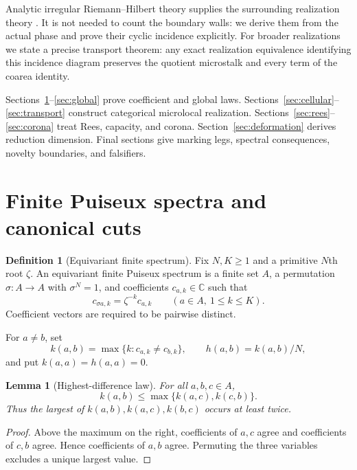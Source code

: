 \documentclass[11pt,a4paper]{amsart}
\theoremstyle{plain}
\newtheorem{lemma}[theorem]{Lemma}
\theoremstyle{definition}
\newtheorem{definition}[theorem]{Definition}
\newcommand{\CC}{\mathbb C}
\begin{document}
Analytic irregular Riemann--Hilbert theory supplies the surrounding realization theory
\cite{Sabbah,DKRH}.  It is not needed to count the boundary walls: we derive them from the actual
phase and prove their cyclic incidence explicitly.  For broader realizations we state a precise
transport theorem: any exact realization equivalence identifying this incidence diagram preserves
the quotient microstalk and every term of the coarea identity.

Sections~\ref{sec:coefficients}--\ref{sec:global} prove coefficient and global laws.
Sections~\ref{sec:cellular}--\ref{sec:transport} construct categorical microlocal realization.
Sections~\ref{sec:rees}--\ref{sec:corona} treat Rees, capacity, and corona.
Section~\ref{sec:deformation} derives reduction dimension.  Final sections give marking legs,
spectral consequences, novelty boundaries, and falsifiers.

\section{Finite Puiseux spectra and canonical cuts}\label{sec:coefficients}

\begin{definition}[Equivariant finite spectrum]\label{def:spectrum}
Fix $N,K\geq1$ and a primitive $N$th root $\zeta$.  An equivariant finite Puiseux spectrum is a
finite set $A$, a permutation $\sigma:A\to A$ with $\sigma^N=1$, and coefficients
$c_{a,k}\in\CC$ such that
\[
                  c_{\sigma a,k}=\zeta^{-k}c_{a,k}
                  \qquad(a\in A,\ 1\leq k\leq K).
\]
Coefficient vectors are required to be pairwise distinct.
\end{definition}

For $a\ne b$, set
\[
 k(a,b)=\max\{k:c_{a,k}\ne c_{b,k}\},\qquad h(a,b)=k(a,b)/N,
\]
and put $k(a,a)=h(a,a)=0$.

\begin{lemma}[Highest-difference law]\label{lem:three-point}
For all $a,b,c\in A$,
\begin{equation}\label{eq:three-point}
                         k(a,b)\leq\max\{k(a,c),k(c,b)\}.
\end{equation}
Thus the largest of $k(a,b),k(a,c),k(b,c)$ occurs at least twice.
\end{lemma}

\begin{proof}
Above the maximum on the right, coefficients of $a,c$ agree and coefficients of $c,b$ agree.
Hence coefficients of $a,b$ agree.  Permuting the three variables excludes a unique largest value.
\end{proof}
\end{document}
